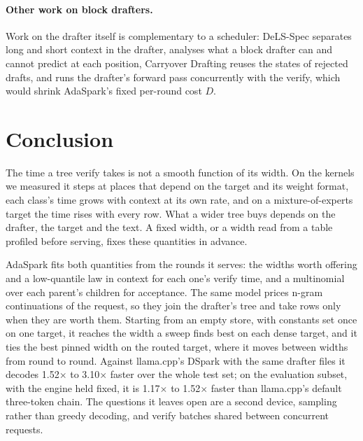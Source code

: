 \documentclass[10pt,twocolumn,letterpaper]{article}
\begin{document}
\paragraph{Other work on block drafters.} Work on the drafter itself is complementary to a scheduler: DeLS-Spec \cite{zheng2026dels} separates long and short context in the drafter, \cite{qiang2026beyond} analyses what a block drafter can and cannot predict at each position, Carryover Drafting \cite{koo2026carryover} reuses the states of rejected drafts, and \cite{liu2026when} runs the drafter's forward pass concurrently with the verify, which would shrink AdaSpark's fixed per-round cost $D$.

\section{Conclusion}\label{sec:7}

The time a tree verify takes is not a smooth function of its width. On the kernels we measured it steps at places that depend on the target and its weight format, each class's time grows with context at its own rate, and on a mixture-of-experts target the time rises with every row. What a wider tree buys depends on the drafter, the target and the text. A fixed width, or a width read from a table profiled before serving, fixes these quantities in advance.

AdaSpark fits both quantities from the rounds it serves: the widths worth offering and a low-quantile law in context for each one's verify time, and a multinomial over each parent's children for acceptance. The same model prices n-gram continuations of the request, so they join the drafter's tree and take rows only when they are worth them. Starting from an empty store, with constants set once on one target, it reaches the width a sweep finds best on each dense target, and it ties the best pinned width on the routed target, where it moves between widths from round to round. Against llama.cpp's DSpark with the same drafter files it decodes 1.52$\times$ to 3.10$\times$ faster over the whole test set; on the evaluation subset, with the engine held fixed, it is 1.17$\times$ to 1.52$\times$ faster than llama.cpp's default three-token chain. The questions it leaves open are a second device, sampling rather than greedy decoding, and verify batches shared between concurrent requests.




\appendix
\end{document}
